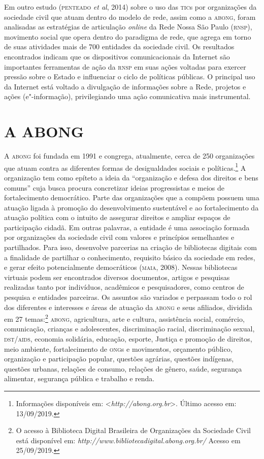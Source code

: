 Em outro estudo (\textsc{penteado} \emph{et al}, 2014) sobre o uso das \textsc{tic}s por
organizações da sociedade civil que atuam dentro do modelo de rede,
assim como a \textsc{abong}, foram analisadas as estratégias de articulação
\emph{online} da Rede Nossa São Paulo (\textsc{rnsp}), movimento social que opera
dentro do paradigma de rede, que agrega em torno de suas atividades mais
de 700 entidades da sociedade civil. Os resultados encontrados indicam
que os dispositivos comunicacionais da Internet são importantes
ferramentas de ação da \textsc{rnsp} em suas ações voltadas para exercer pressão
sobre o Estado e influenciar o ciclo de políticas públicas. O principal
uso da Internet está voltado a divulgação de informações sobre a Rede,
projetos e ações (e"-informação), privilegiando uma ação comunicativa
mais instrumental.

\section{A ABONG}

A \textsc{abong} foi fundada em 1991 e congrega, atualmente, cerca de 250
organizações que atuam contra as diferentes formas de desigualdades
sociais e políticas.\footnote{Informações disponíveis em:
  \textless{}\emph{http://abong.org.br}\textgreater{}.
  Último acesso em: 13/09/2019.} A organização tem como epíteto a ideia
da ``organização e defesa dos direitos e bens comuns'' cuja busca procura
concretizar ideias progressistas e meios de fortalecimento democrático.
Parte das organizações que a compõem possuem uma atuação ligada à
promoção do desenvolvimento sustentável e ao fortalecimento da atuação
política com o intuito de assegurar direitos e ampliar espaços de
participação cidadã. Em outras palavras, a entidade é uma associação
formada por organizações da sociedade civil com valores e princípios
semelhantes e partilhados. Para isso, desenvolve parcerias na criação de
bibliotecas digitais com a finalidade de partilhar o conhecimento,
requisito básico da sociedade em redes, e gerar efeito potencialmente
democráticos (\textsc{maia}, 2008). Nessas bibliotecas virtuais podem ser
encontrados diversos documentos, artigos e pesquisas realizadas tanto
por indivíduos, acadêmicos e pesquisadores, como centros de pesquisa e
entidades parceiras. Os assuntos são variados e perpassam todo o rol dos
diferentes e interesses e áreas de atuação da \textsc{abong} e seus afiliados,
dividida em 27 temas:\footnote{O acesso à Biblioteca Digital Brasileira
  de Organizações da Sociedade Civil está disponível em:
  \emph{http://www.bibliotecadigital.abong.org.br/}
  Acesso em 25/09/2019.} \textsc{abong}, agricultura, arte e cultura,
assistência social, comércio, comunicação, crianças e adolescentes,
discriminação racial, discriminação sexual, \textsc{dst}/\textsc{aids}, economia
solidária, educação, esporte, Justiça e promoção de direitos, meio
ambiente, fortalecimento de \textsc{ong}s e movimentos, orçamento público,
organização e participação popular, questões agrárias, questões
indígenas, questões urbanas, relações de consumo, relações de gênero,
saúde, segurança alimentar, segurança pública e trabalho e renda.

